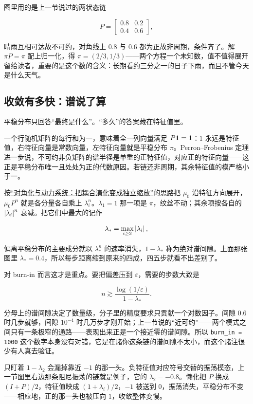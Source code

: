 图里用的是上一节说过的两状态链

\[
P=\begin{bmatrix}0.8&0.2\\0.4&0.6\end{bmatrix},
\]

晴雨互相可达故不可约，对角线上 \(0.8\) 与 \(0.6\) 都为正故非周期，条件齐了。解 \(\pi P=\pi\) 配上归一化，得 \(\pi=(2/3,1/3)\)——两个方程一个未知数，值不值得展开留给读者，重要的是这个数的含义：长期看约三分之一的日子下雨，而且不管今天是什么天气。

\subsection{收敛有多快：谱说了算}

平稳分布只回答``最终是什么''。``多久''的答案藏在特征值里。

一个行随机矩阵的每行和为一，意味着全一列向量满足 \(P\mathbf{1}=\mathbf{1}\)：\(1\) 永远是特征值，右特征向量是常数向量，左特征向量就是平稳分布 \(\pi\)。Perron--Frobenius 定理进一步说，不可约非负矩阵的谱半径是单重的正特征值，对应正的特征向量——这正是平稳分布唯一且处处为正的代数原因。若链还非周期，其余特征值的模严格小于一。

按\hyperref[sec:03-Linear-Algebra/05-Eigenvalues-and-Eigenvectors/02]{``对角化与动力系统：把耦合演化变成独立缩放''}的思路把 \(\mu_0\) 沿特征方向展开，\(\mu_0P^n\) 就是各分量各自乘上 \(\lambda_i^n\)。\(\lambda_1=1\) 那一项是 \(\pi\)，纹丝不动；其余项按各自的 \(\left|\lambda_i\right|^n\) 衰减。把它们中最大的记作

\[
\lambda_*=\max_{i\ge2}\left|\lambda_i\right|,
\]

偏离平稳分布的主要成分就以 \(\lambda_*^n\) 的速率消失，\(1-\lambda_*\) 称为绝对谱间隙。上面那张图里 \(\lambda_*=0.4\)，所以每步距离缩到原来的四成，四五步就看不出差别了。

对 burn-in 而言这才是重点。要把偏差压到 \(\varepsilon\)，需要的步数大致是

\[
n\gtrsim\frac{\log(1/\varepsilon)}{1-\lambda_*}.
\]

分母上的谱间隙决定了数量级，分子里的精度要求只贡献一个对数因子。间隙 \(0.6\) 时几步就够，间隙 \(10^{-4}\) 时几万步才刚开始；上一节说的``近可约''——两个模式之间只有一条极窄的通路——表现出来正是一个接近零的谱间隙。所以 \texttt{burn\_in = 1000} 这个数字本身没有对错，它是在赌你这条链的谱间隙不太小，而这个赌注很少有人真去验证。

只盯着 \(1-\lambda_2\) 会漏掉靠近 \(-1\) 的那一头。负特征值对应符号交替的振荡模态，上一节图里右边那条阻尼振荡的链就是例子，它的 \(\lambda_2=-0.8\)。懒化把 \(P\) 换成 \((I+P)/2\)，特征值映成 \((1+\lambda_i)/2\)，\(-1\) 被送到 \(0\)，振荡消失，平稳分布不变——相应地，正的那一头也被压向 \(1\)，收敛整体变慢。

